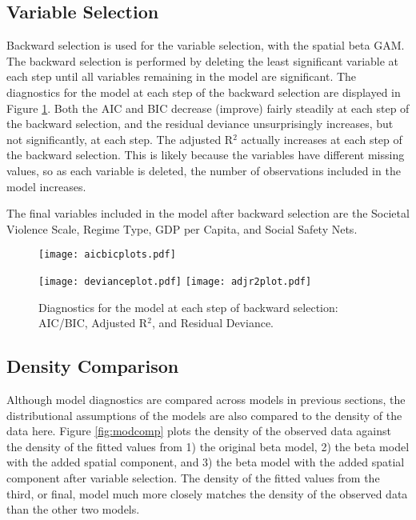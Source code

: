 \documentclass[letterpaper,11pt]{article}
\begin{document}
\subsection{Variable Selection}

Backward selection is used for the variable selection, with the spatial beta GAM. The backward selection is performed by deleting the least significant variable at each step until all variables remaining in the model are significant. The diagnostics for the model at each step of the backward selection are displayed in Figure \ref{fig:modselect}. Both the AIC and BIC decrease (improve) fairly steadily at each step of the backward selection, and the residual deviance unsurprisingly increases, but not significantly, at each step. The adjusted R$^2$ actually increases at each step of the backward selection. This is likely because the variables have different missing values, so as each variable is deleted, the number of observations included in the model increases.

The final variables included in the model after backward selection are the Societal Violence Scale, Regime Type, GDP per Capita, and Social Safety Nets. 

\begin{figure}
\centering
\begin{minipage}{.55\textwidth}
\renewcommand\thefigure{1.1}
  \begin{centering}
  \texttt{[image: aicbicplots.pdf]}
  \end{centering}
\end{minipage}%
\begin{minipage}{.40\textwidth}
\renewcommand\thefigure{1.2}
  \centering
  \texttt{[image: devianceplot.pdf]}
\texttt{[image: adjr2plot.pdf]}
\end{minipage}
\caption{Diagnostics for the model at each step of backward selection: AIC/BIC, Adjusted R$^2$, and Residual Deviance.}
\label{fig:modselect}
\end{figure}

\subsection{Density Comparison}

Although model diagnostics are compared across models in previous sections, the distributional assumptions of the models are also compared to the density of the data here. Figure \ref{fig:modcomp} plots the density of the observed data against the density of the fitted values from 1) the original beta model, 2) the beta model with the added spatial component, and 3) the beta model with the added spatial component after variable selection. The density of the fitted values from the third, or final, model much more closely matches the density of the observed data than the other two models.
\end{document}
